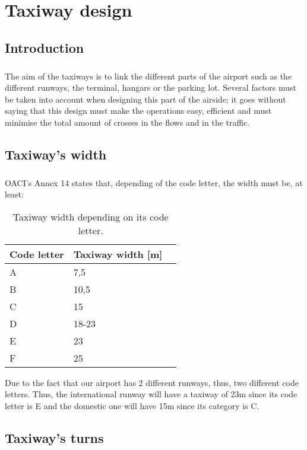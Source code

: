 \chapter{Taxiway design}
	
	\section{Introduction}
	\paragraph{}The aim of the taxiways is to link the different parts of the airport such as the different runways, the terminal, hangars or the parking lot. Several factors must be taken into account when designing this part of the airside; it goes without saying that this design must make the operations easy, efficient and must minimise the total amount of crosses in the flows and in the traffic.
	
	\section{Taxiway's width}
	\paragraph{}OACI’s Annex 14 states that, depending of the code letter, the width must be, at least:
	
	\begin{table}[htb]
		\centering
		\begin{tabular}{ll p{5cm}}
			\toprule[2pt]
			Code letter & Taxiway width [m]\\
			\midrule[1pt]
			A & 7,5\\
			B & 10,5 \\
			C & 15\\
			D & 18-23\\
			E & 23\\
			F & 25\\
			\bottomrule[2pt]
		\end{tabular}
		\caption{Taxiway width depending on its code letter.}
		\label{}
	\end{table}
	
	Due to the fact that our airport has 2 different runways, thus, two different code letters. Thus, the international runway will have a taxiway of 23m since its code letter is E and the domestic one will have 15m since its category is C.
	
	\section{Taxiway's turns}
